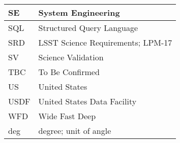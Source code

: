 \begin{longtable}{p{}p{}}
SE & System Engineering \\\hline
SQL & Structured Query Language \\\hline
SRD & LSST Science Requirements; LPM-17 \\\hline
SV & Science Validation \\\hline
TBC & To Be Confirmed \\\hline
US & United States \\\hline
USDF & United States Data Facility \\\hline
WFD & Wide Fast Deep \\\hline
deg & degree; unit of angle \\\hline
\end{longtable}
